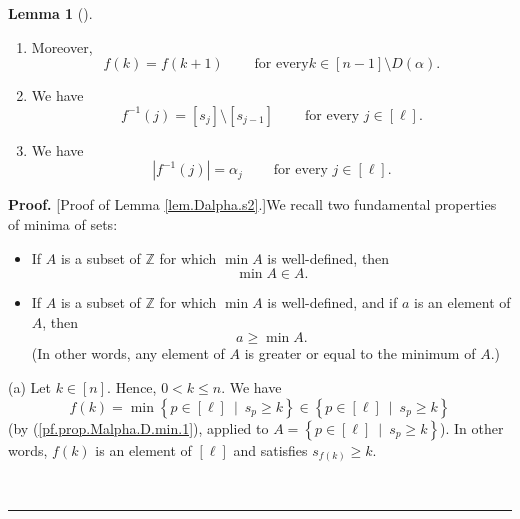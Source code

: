 \documentclass[numbers=enddot,12pt,final,onecolumn,notitlepage,abstracton]{scrartcl}
\theoremstyle{definition}
\newtheorem{lem}[theo]{Lemma}
\newenvironment{lemma}[1][]
{\begin{lem}[#1]\begin{leftbar}}
{\end{leftbar}\end{lem}}
\newenvironment{proof}[1][Proof]{\noindent\textbf{#1.} }{\ \rule{0.5em}{0.5em}}
\newenvironment{verlong}{}{}
\begin{document}
\begin{verlong}
\begin{footnotesize}
\begin{lemma}
\begin{enumerate}
\item[(f)] Moreover,%
\begin{equation}
f\left(  k\right)  =f\left(  k+1\right)  \ \ \ \ \ \ \ \ \ \ \text{for every
}k\in\left[  n-1\right]  \setminus D\left(  \alpha\right)  .
\label{pf.prop.Malpha.D.f.5}%
\end{equation}


\item[(g)] We have%
\begin{equation}
f^{-1}\left(  j\right)  =\left[  s_{j}\right]  \setminus\left[  s_{j-1}%
\right]  \ \ \ \ \ \ \ \ \ \ \text{for every }j\in\left[  \ell\right]  .
\label{pf.prop.Malpha.D.f-1.1}%
\end{equation}


\item[(h)] We have%
\begin{equation}
\left\vert f^{-1}\left(  j\right)  \right\vert =\alpha_{j}%
\ \ \ \ \ \ \ \ \ \ \text{for every }j\in\left[  \ell\right]  .
\label{pf.prop.Malpha.D.f-1.2}%
\end{equation}

\end{enumerate}
\end{lemma}

\begin{proof}
[Proof of Lemma \ref{lem.Dalpha.s2}.]We recall two fundamental properties of
minima of sets:

\begin{itemize}
\item If $A$ is a subset of $\mathbb{Z}$ for which $\min A$ is well-defined,
then%
\begin{equation}
\min A\in A. \label{pf.prop.Malpha.D.min.1}%
\end{equation}


\item If $A$ is a subset of $\mathbb{Z}$ for which $\min A$ is well-defined,
and if $a$ is an element of $A$, then
\begin{equation}
a\geq\min A. \label{pf.prop.Malpha.D.min.2}%
\end{equation}
(In other words, any element of $A$ is greater or equal to the minimum of $A$.)
\end{itemize}

(a) Let $k\in\left[  n\right]  $. Hence, $0<k\leq n$. We have%
\[
f\left(  k\right)  =\min\left\{  p\in\left[  \ell\right]  \ \mid\ s_{p}\geq
k\right\}  \in\left\{  p\in\left[  \ell\right]  \ \mid\ s_{p}\geq k\right\}
\]
(by (\ref{pf.prop.Malpha.D.min.1}), applied to $A=\left\{  p\in\left[
\ell\right]  \ \mid\ s_{p}\geq k\right\}  $). In other words, $f\left(
k\right)  $ is an element of $\left[  \ell\right]  $ and satisfies
$s_{f\left(  k\right)  }\geq k$.


\end{proof}
\end{footnotesize}
\end{verlong}
\end{document}
